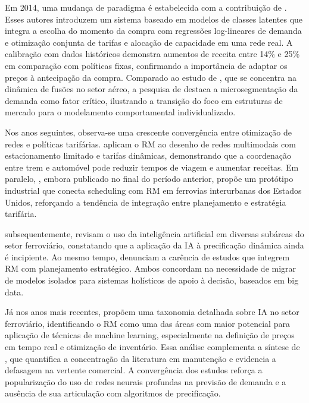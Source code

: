 Em 2014, uma mudança de paradigma é estabelecida com a contribuição de \citep{HETRAKUL201468}. Esses autores introduzem um sistema baseado em modelos de classes latentes que integra a escolha do momento da compra com regressões log-lineares de demanda e otimização conjunta de tarifas e alocação de capacidade em uma rede real. A calibração com dados históricos demonstra aumentos de receita entre 14\% e 25\% em comparação com políticas fixas, confirmando a importância de adaptar os preços à antecipação da compra. Comparado ao estudo de \citep{Dobson2013}, que se concentra na dinâmica de fusões no setor aéreo, a pesquisa de \citep{HETRAKUL201468} destaca a microsegmentação da demanda como fator crítico, ilustrando a transição do foco em estruturas de mercado para o modelamento comportamental individualizado.

Nos anos seguintes, observa-se uma crescente convergência entre otimização de redes e políticas tarifárias. \citep{ZHENG2016} aplicam o RM ao desenho de redes multimodais com estacionamento limitado e tarifas dinâmicas, demonstrando que a coordenação entre trem e automóvel pode reduzir tempos de viagem e aumentar receitas. Em paralelo, \citep{Casey2014}, embora publicado no final do período anterior, propõe um protótipo industrial que conecta scheduling com RM em ferrovias interurbanas dos Estados Unidos, reforçando a tendência de integração entre planejamento e estratégia tarifária.

subsequentemente, \citep{TANG2022} revisam o uso da inteligência artificial em diversas subáreas do setor ferroviário, constatando que a aplicação da IA à precificação dinâmica ainda é incipiente. Ao mesmo tempo, \citep{Ammirato2020} denunciam a carência de estudos que integrem RM com planejamento estratégico. Ambos concordam na necessidade de migrar de modelos isolados para sistemas holísticos de apoio à decisão, baseados em big data.

Já nos anos mais recentes, \citep{Besinovic2022} propõem uma taxonomia detalhada sobre IA no setor ferroviário, identificando o RM como uma das áreas com maior potencial para aplicação de técnicas de machine learning, especialmente na definição de preços em tempo real e otimização de inventário. Essa análise complementa a síntese de \citep{TANG2022}, que quantifica a concentração da literatura em manutenção e evidencia a defasagem na vertente comercial. A convergência dos estudos reforça a popularização do uso de redes neurais profundas na previsão de demanda e a ausência de sua articulação com algoritmos de precificação.

